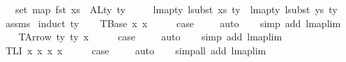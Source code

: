 \begin{isabellebody}
\ \ \ {\isachardoublequoteopen}set\ {\isacharparenleft}{\kern0pt}map\ fst\ xs{}{\isacharparenright}{\kern0pt}\ {\isasyminter}\ ALty\ ty\ {\isacharequal}{\kern0pt}\ {\isacharbraceleft}{\kern0pt}{\isacharbraceright}{\kern0pt}{\isachardoublequoteclose}\isanewline
\ \ \ {\isachardoublequoteopen}lmap{\isacharunderscore}{\kern0pt}ty\ {\isacharparenleft}{\kern0pt}lsubst\ xs{}{\isacharparenright}{\kern0pt}\ ty\ {\isacharequal}{\kern0pt}\ lmap{\isacharunderscore}{\kern0pt}ty\ {\isacharparenleft}{\kern0pt}lsubst\ ys{\isacharparenright}{\kern0pt}\ ty{\isachardoublequoteclose}\isanewline
%
\isadelimproof
%
\endisadelimproof
%
\isatagproof
{}\isamarkupfalse%
\ assms\isanewline
{}\isamarkupfalse%
\ {\isacharparenleft}{\kern0pt}induct\ ty{\isacharparenright}{\kern0pt}\isanewline
\ \ \isamarkupfalse%
\ {\isacharparenleft}{\kern0pt}TBase\ x{}\ x{}{\isacharparenright}{\kern0pt}\isanewline
\ \ \isamarkupfalse%
\ \isamarkupfalse%
\ {\isacharquery}{\kern0pt}case\ \isanewline
\ \ \isamarkupfalse%
\ auto\isanewline
\ \ \isamarkupfalse%
\ {\isacharparenleft}{\kern0pt}simp\ add{\isacharcolon}{\kern0pt}\ lmap{\isacharunderscore}{\kern0pt}lim{}{\isacharparenright}{\kern0pt}\isanewline
{}\isamarkupfalse%
\isanewline
\ \ \isamarkupfalse%
\ {\isacharparenleft}{\kern0pt}TArrow\ ty{}\ ty{}\ x{}{\isacharparenright}{\kern0pt}\isanewline
\ \ \isamarkupfalse%
\ \isamarkupfalse%
\ {\isacharquery}{\kern0pt}case\ \isanewline
\ \ \isamarkupfalse%
\ auto\isanewline
\ \ \isamarkupfalse%
\ {\isacharparenleft}{\kern0pt}simp\ add{\isacharcolon}{\kern0pt}\ lmap{\isacharunderscore}{\kern0pt}lim{}{\isacharparenright}{\kern0pt}\isanewline
{}\isamarkupfalse%
\isanewline
\ \ \isamarkupfalse%
\ {\isacharparenleft}{\kern0pt}TLI\ x{}\ x{}\ x{}\ x{}{\isacharparenright}{\kern0pt}\isanewline
\ \ \isamarkupfalse%
\ \isamarkupfalse%
\ {\isacharquery}{\kern0pt}case\ \isanewline
\ \ \isamarkupfalse%
\ auto\isanewline
\ \ \isamarkupfalse%
\ {\isacharparenleft}{\kern0pt}simp{\isacharunderscore}{\kern0pt}all\ add{\isacharcolon}{\kern0pt}\ lmap{\isacharunderscore}{\kern0pt}lim{}{\isacharparenright}{\kern0pt}\isanewline

\end{isabellebody}
